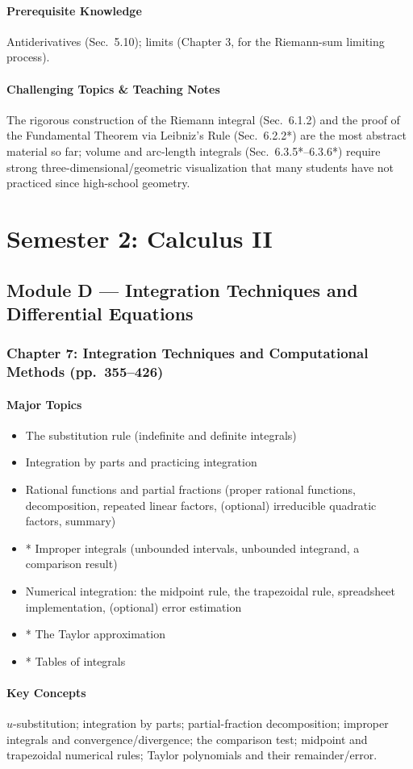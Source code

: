 \documentclass[11pt]{article}
\newcommand{\ChapHead}[2]{\subsubsection{#1 \textnormal{\normalfont\normalsize\color{lightgray}(pp.\ #2)}}}
\newcommand{\MajorTopics}{\paragraph{Major Topics}}
\newcommand{\KeyConcepts}{\paragraph{Key Concepts}}
\newcommand{\PreReq}{\paragraph{Prerequisite Knowledge}}
\newcommand{\Hard}{\paragraph{Challenging Topics \& Teaching Notes}}
\begin{document}
\PreReq Antiderivatives (Sec.\ 5.10); limits (Chapter 3, for the Riemann-sum limiting process).

\Hard The rigorous construction of the Riemann integral (Sec.\ 6.1.2) and
the proof of the Fundamental Theorem via Leibniz's Rule (Sec.\ 6.2.2*) are
the most abstract material so far; volume and arc-length integrals (Sec.\
6.3.5*--6.3.6*) require strong three-dimensional/geometric visualization
that many students have not practiced since high-school geometry.

\newpage
\section{Semester 2: Calculus II}

\subsection{Module D --- Integration Techniques and Differential Equations}

\ChapHead{Chapter 7: Integration Techniques and Computational Methods}{355--426}

\MajorTopics
\begin{itemize}
\item The substitution rule (indefinite and definite integrals)
\item Integration by parts and practicing integration
\item Rational functions and partial fractions (proper rational functions, decomposition, repeated linear factors, (optional) irreducible quadratic factors, summary)
\item * Improper integrals (unbounded intervals, unbounded integrand, a comparison result)
\item Numerical integration: the midpoint rule, the trapezoidal rule, spreadsheet implementation, (optional) error estimation
\item * The Taylor approximation
\item * Tables of integrals
\end{itemize}

\KeyConcepts
$u$-substitution; integration by parts; partial-fraction decomposition;
improper integrals and convergence/divergence; the comparison test;
midpoint and trapezoidal numerical rules; Taylor polynomials and their
remainder/error.
\end{document}
